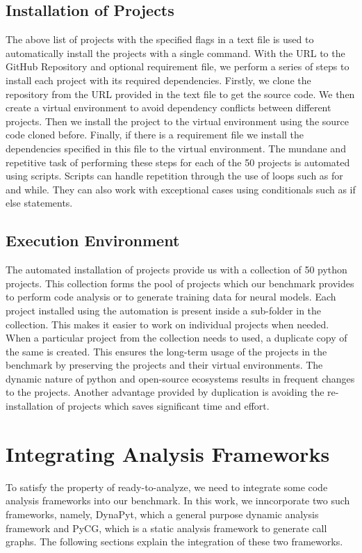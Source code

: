 \subsection{Installation of Projects}
\label{approach:bash scripts}
The above list of projects with the specified flags in a text file is used to automatically install the projects with a single command.
With the URL to the GitHub Repository and optional requirement file, we perform a series of steps to install each project with its required dependencies.
Firstly, we clone the repository from the URL provided in the text file to get the source code.
We then create a virtual environment to avoid dependency conflicts between different projects.
Then we install the project to the virtual environment using the source code cloned before. 
Finally, if there is a requirement file we install the dependencies specified in this file to the virtual environment.
The mundane and repetitive task of performing these steps for each of the 50 projects is automated using scripts.
Scripts can handle repetition through the use of loops such as for and while.
They can also work with exceptional cases using conditionals such as if else statements.  

\subsection{Execution Environment}
\label{approach:collection of projects}
The automated installation of projects provide us with a collection of 50 python projects.
This collection forms the pool of projects which our benchmark provides to perform code analysis or to generate training data for neural models.
Each project installed using the automation is present inside a sub-folder in the collection.
This makes it easier to work on individual projects when needed.
When a particular project from the collection needs to used, a duplicate copy of the same is created.
This ensures the long-term usage of the projects in the benchmark by preserving the projects and their virtual environments.
The dynamic nature of python and open-source ecosystems results in frequent changes to the projects.
Another advantage provided by duplication is avoiding the re-installation of projects which saves significant time and effort. 

\section{Integrating Analysis Frameworks}
\label{approach:analysis framework}
To satisfy the property of ready-to-analyze, we need to integrate some code analysis frameworks into our benchmark.
In this work, we inncorporate two such frameworks, namely, DynaPyt,  which a general purpose dynamic analysis framework and PyCG, which is a static analysis framework to generate call graphs.
The following sections explain the integration of these two frameworks.
